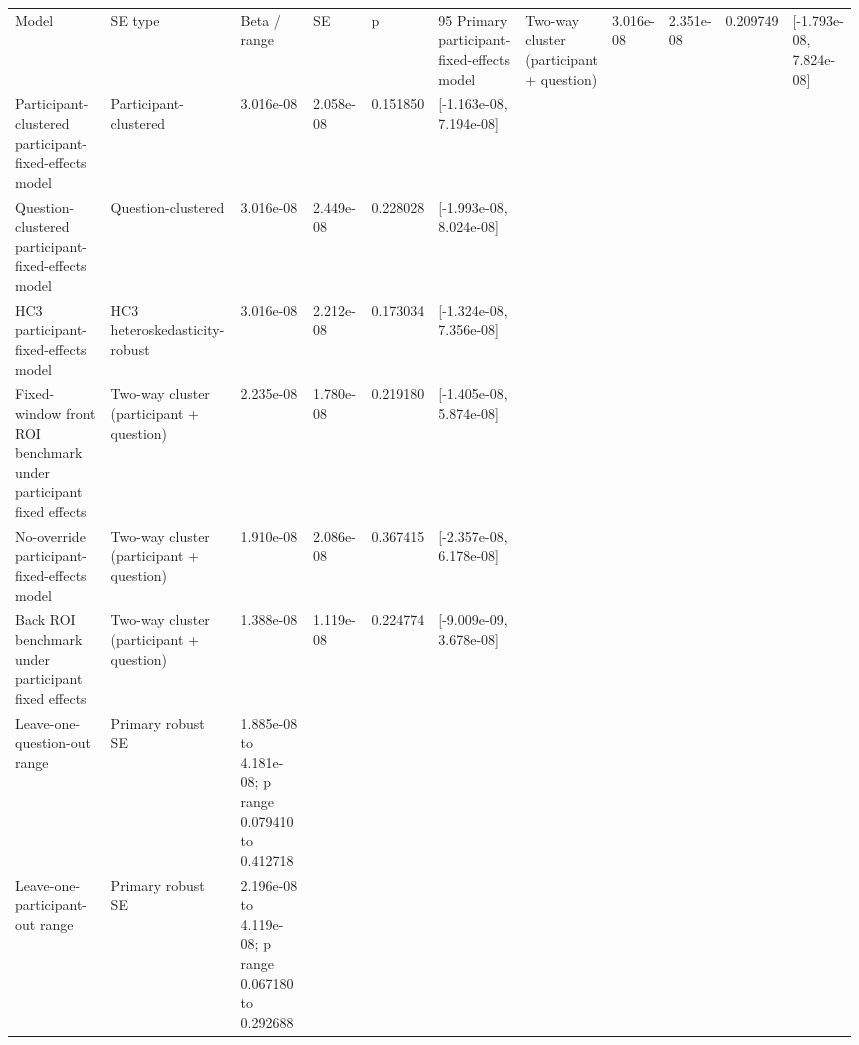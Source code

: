 \begin{tabular}{p{0.28\linewidth}p{0.20\linewidth}p{0.20\linewidth}p{0.10\linewidth}p{0.08\linewidth}p{0.12\linewidth}}
\toprule
Model & SE type & Beta / range & SE & p & 95%
\midrule
Primary participant-fixed-effects model & Two-way cluster (participant + question) & 3.016e-08 & 2.351e-08 & 0.209749 & [-1.793e-08, 7.824e-08]\\
Participant-clustered participant-fixed-effects model & Participant-clustered & 3.016e-08 & 2.058e-08 & 0.151850 & [-1.163e-08, 7.194e-08]\\
Question-clustered participant-fixed-effects model & Question-clustered & 3.016e-08 & 2.449e-08 & 0.228028 & [-1.993e-08, 8.024e-08]\\
HC3 participant-fixed-effects model & HC3 heteroskedasticity-robust & 3.016e-08 & 2.212e-08 & 0.173034 & [-1.324e-08, 7.356e-08]\\
Fixed-window front ROI benchmark under participant fixed effects & Two-way cluster (participant + question) & 2.235e-08 & 1.780e-08 & 0.219180 & [-1.405e-08, 5.874e-08]\\
No-override participant-fixed-effects model & Two-way cluster (participant + question) & 1.910e-08 & 2.086e-08 & 0.367415 & [-2.357e-08, 6.178e-08]\\
Back ROI benchmark under participant fixed effects & Two-way cluster (participant + question) & 1.388e-08 & 1.119e-08 & 0.224774 & [-9.009e-09, 3.678e-08]\\
Leave-one-question-out range & Primary robust SE & 1.885e-08 to 4.181e-08; p range 0.079410 to 0.412718 &  &  & \\
Leave-one-participant-out range & Primary robust SE & 2.196e-08 to 4.119e-08; p range 0.067180 to 0.292688 &  &  & \\
\bottomrule
\end{tabular}
